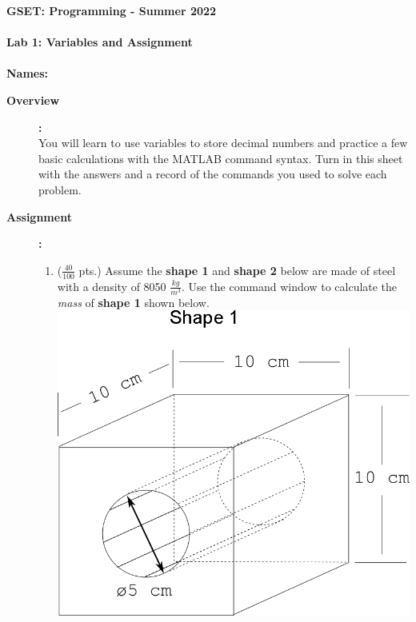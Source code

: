 \documentclass[11pt]{article}
\newcommand{\secNum}{GSET: Programming}
\newcommand{\assnType}{Lab}
\newcommand{\assnTitle}{Variables and Assignment}
\newcommand{\assnNum}{1}
\newcommand{\currTerm}{Summer 2022}
\begin{document}
	\textbf{\LARGE \secNum \hspace{1mm} - \hspace{1mm} \currTerm} \\\\
	\textbf{\LARGE \assnType \hspace{1mm}  \assnNum : \assnTitle} \\\\
	\textbf{Names:\underline{\hspace{140mm}} } \\
	\begin{description}

		\item [\textbf{ \large Overview}] \textbf{ \Large :}\\
			You will learn to use variables to store decimal numbers and practice a few basic calculations with the MATLAB command syntax. Turn in this sheet with the answers and a record of the commands you used to solve each problem.

        \item [\textbf{ \large Assignment}] \textbf{ \Large :}
            \begin{enumerate}
            \item ($\frac{40}{100}$ pts.)
            Assume the {\bf shape 1} and {\bf shape 2} below are made of steel with a density of 8050 $\frac{kg}{m^3}$. Use the command window to calculate the {\it mass} of {\bf shape 1} shown below.\\
            
            	\includegraphics[scale=.25]{images/lab1_fig1.png}\\
               

\end{enumerate}
\end{description}
\end{document}
